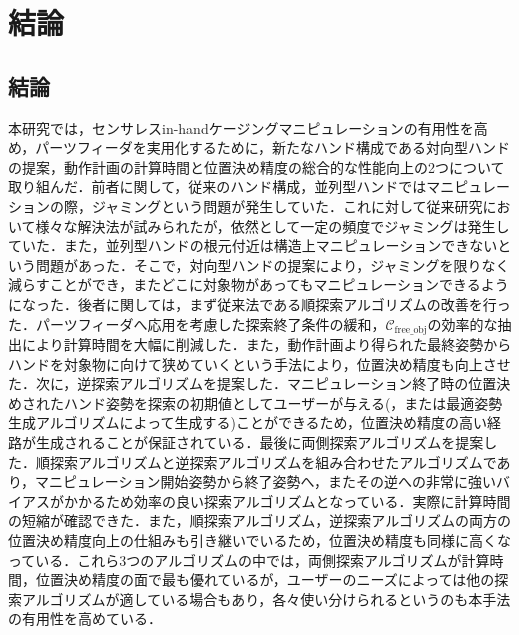 \documentclass[a4paper,twoside,12pt,papersize, dvipdfmx]{iirthesis}
\begin{document}
    \newcommand{\figref}[1]{\figurename\ref{#1}}
    \newcommand{\tabref}[1]{\tablename\ref{#1}}
    \renewcommand{\eqref}[1]{式~(\ref{#1})}
    \newcommand{\chapref}[1]{\ref{#1}章}
    \newcommand{\secref}[1]{\ref{#1}節}
    \newcommand{\ssecref}[1]{\ref{#1}項}
    \newcommand{\appref}[1]{付録\ref{#1}}
\fi


\chapter{結論}\label{chap::conclusion}
\minitoc
\section{結論}\label{sec::conclusion::conclusion}
本研究では，センサレスin-handケージングマニピュレーションの有用性を高め，パーツフィーダを実用化するために，新たなハンド構成である対向型ハンドの提案，動作計画の計算時間と位置決め精度の総合的な性能向上の2つについて取り組んだ．前者に関して，従来のハンド構成，並列型ハンドではマニピュレーションの際，ジャミングという問題が発生していた．これに対して従来研究において様々な解決法が試みられたが，依然として一定の頻度でジャミングは発生していた．また，並列型ハンドの根元付近は構造上マニピュレーションできないという問題があった．そこで，対向型ハンドの提案により，ジャミングを限りなく減らすことができ，またどこに対象物があってもマニピュレーションできるようになった．後者に関しては，まず従来法である順探索アルゴリズムの改善を行った．パーツフィーダへ応用を考慮した探索終了条件の緩和，$\mathcal{C}_{\mathrm{free\_obj}}$の効率的な抽出により計算時間を大幅に削減した．また，動作計画より得られた最終姿勢からハンドを対象物に向けて狭めていくという手法により，位置決め精度も向上させた．次に，逆探索アルゴリズムを提案した．マニピュレーション終了時の位置決めされたハンド姿勢を探索の初期値としてユーザーが与える(，または最適姿勢生成アルゴリズムによって生成する)ことができるため，位置決め精度の高い経路が生成されることが保証されている．最後に両側探索アルゴリズムを提案した．順探索アルゴリズムと逆探索アルゴリズムを組み合わせたアルゴリズムであり，マニピュレーション開始姿勢から終了姿勢へ，またその逆への非常に強いバイアスがかかるため効率の良い探索アルゴリズムとなっている．実際に計算時間の短縮が確認できた．また，順探索アルゴリズム，逆探索アルゴリズムの両方の位置決め精度向上の仕組みも引き継いでいるため，位置決め精度も同様に高くなっている．これら3つのアルゴリズムの中では，両側探索アルゴリズムが計算時間，位置決め精度の面で最も優れているが，ユーザーのニーズによっては他の探索アルゴリズムが適している場合もあり，各々使い分けられるというのも本手法の有用性を高めている．\par
\end{document}

